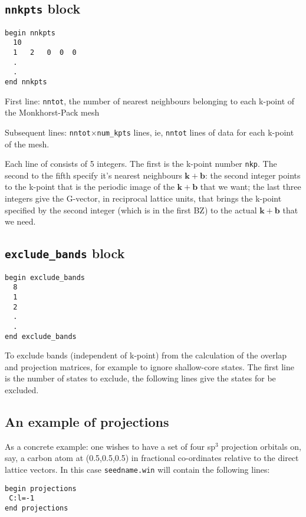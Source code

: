 \subsection{{\tt nnkpts} block}
\begin{verbatim}
begin nnkpts
  10
  1   2   0  0  0
  .
  .
end nnkpts
\end{verbatim}

First line: \verb#nntot#, the number of nearest neighbours belonging
to each k-point of the Monkhorst-Pack mesh

Subsequent lines: \verb#nntot#$\times$\verb#num_kpts#
lines, ie, \verb#nntot# lines of data for each k-point of the mesh. 

Each line of consists of 5 integers. The first is the
k-point number \verb#nkp#. The second to the fifth specify it's nearest
neighbours $\mathbf{k+b}$: the second integer points to the k-point
that is the periodic image of the $\mathbf{k+b}$ that we want; the
last three integers give the G-vector, in reciprocal lattice units,
that brings the k-point specified by the second integer (which is in
the first BZ) to the actual $\mathbf{k+b}$ that we need.


\subsection{{\tt exclude\_bands} block}
\begin{verbatim}
begin exclude_bands 
  8 
  1 
  2 
  .
  .
end exclude_bands
\end{verbatim}
To exclude bands (independent of k-point) from the calculation of the 
overlap and projection matrices, for example to ignore shallow-core states.
The first line is the number of states to exclude, the following lines give
the states for be excluded.


\subsection{An example of projections}\label{sec:proj_example}

As a concrete example: one wishes to have a set of four sp$^3$ projection
orbitals on, say, a carbon atom at (0.5,0.5,0.5) in fractional
co-ordinates relative to the direct lattice vectors. In this case
\verb#seedname.win# will contain the following lines:

\begin{verbatim}
begin projections
 C:l=-1
end projections
\end{verbatim}

